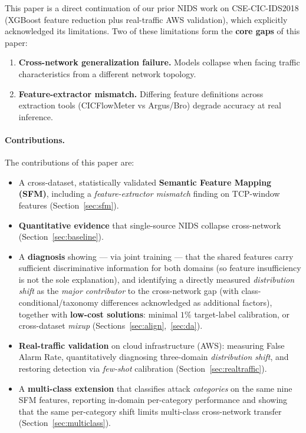\documentclass[preprint,12pt,authoryear]{elsarticle}
\begin{document}
This paper is a direct continuation of our prior NIDS work on CSE-CIC-IDS2018
(XGBoost \citep{xgboost} feature reduction plus real-traffic AWS validation), which
explicitly acknowledged its limitations. Two of these limitations form the
\textbf{core gaps} of this paper:
\begin{enumerate}
  \item \textbf{Cross-network generalization failure.} Models collapse when facing
  traffic characteristics from a different network topology.
  \item \textbf{Feature-extractor mismatch.} Differing feature definitions across
  extraction tools (CICFlowMeter vs Argus/Bro) degrade accuracy at real inference.
\end{enumerate}

\paragraph{Contributions.} The contributions of this paper are:
\begin{itemize}
  \item A cross-dataset, statistically validated \textbf{Semantic Feature Mapping
  (SFM)}, including a \emph{feature-extractor mismatch} finding on TCP-window
  features (Section~\ref{sec:sfm}).
  \item \textbf{Quantitative evidence} that single-source NIDS collapse
  cross-network (Section~\ref{sec:baseline}).
  \item A \textbf{diagnosis} showing --- via joint training --- that the shared
  features carry sufficient discriminative information for both domains (so feature
  insufficiency is not the sole explanation), and identifying a directly measured
  \emph{distribution shift} as the \emph{major contributor} to the cross-network gap
  (with class-conditional/taxonomy differences acknowledged as additional factors),
  together with \textbf{low-cost solutions}: minimal $1\%$ target-label calibration,
  or cross-dataset \emph{mixup} (Sections~\ref{sec:align},~\ref{sec:da}).
  \item \textbf{Real-traffic validation} on cloud infrastructure (AWS): measuring
  False Alarm Rate, quantitatively diagnosing three-domain \emph{distribution
  shift}, and restoring detection via \emph{few-shot} calibration
  (Section~\ref{sec:realtraffic}).
  \item A \textbf{multi-class extension} that classifies attack \emph{categories}
  on the same nine SFM features, reporting in-domain per-category performance and
  showing that the same per-category shift limits multi-class cross-network
  transfer (Section~\ref{sec:multiclass}).
\end{itemize}
\end{document}
